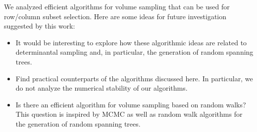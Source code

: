 \documentclass[11pt]{article}
\begin{document}
We analyzed efficient algorithms for volume sampling that can be used for row/column subset selection. Here are some ideas for future investigation suggested by this work:
\begin{itemize}
\item It would be interesting to explore how these algorithmic ideas are related to determinantal sampling \cite{lyons2003determinantal,hough2006determinantal} and, in particular, the generation of random spanning trees.

\item Find practical counterparts of the algorithms discussed here. In particular, we do not analyze the numerical stability of our algorithms.

\item Is there an efficient algorithm for volume sampling based on random walks? This question is inspired by MCMC as well as random walk algorithms for the generation of random spanning trees.
\end{itemize}



    

\end{document}
